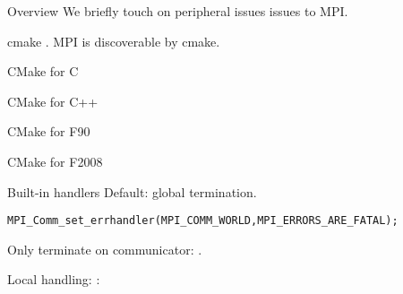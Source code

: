 
\begin{numberedframe}{Overview}
  We briefly touch on peripheral issues issues to MPI.
\end{numberedframe}


\begin{numberedframe}{cmake}
  \label{sl:mpi-cmake}.
  MPI is discoverable by cmake.
\end{numberedframe}

\begin{c}
  \begin{numberedframe}{CMake for C}
    
  \end{numberedframe}
\end{c}

\begin{cxx}
  \begin{numberedframe}{CMake for C++}
    
  \end{numberedframe}
\end{cxx}

\begin{fortran}
\begin{numberedframe}{CMake for F90}

\end{numberedframe}
\end{fortran}

\begin{fortran}
\begin{numberedframe}{CMake for F2008}

\end{numberedframe}
\end{fortran}


\begin{numberedframe}{Built-in handlers}
  \label{sl:errhandler}
Default: global termination.
\begin{lstlisting}
MPI_Comm_set_errhandler(MPI_COMM_WORLD,MPI_ERRORS_ARE_FATAL);
\end{lstlisting}

\begin{mpifour}
  Only terminate on communicator: .
\end{mpifour}
  
Local handling: :
\end{numberedframe}

